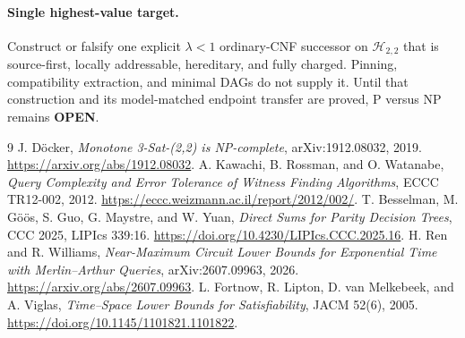 \documentclass[11pt]{article}
\begin{document}
\paragraph{Single highest-value target.}
Construct or falsify one explicit $\lambda<1$ ordinary-CNF successor on
$\mathcal H_{2,2}$ that is source-first, locally addressable, hereditary, and
fully charged.  Pinning, compatibility extraction, and minimal DAGs do not
supply it.  Until that construction and its model-matched endpoint transfer
are proved, P versus NP remains \textbf{OPEN}.

\begin{thebibliography}{9}
 J. D\"ocker, \emph{Monotone 3-Sat-(2,2) is NP-complete},
arXiv:1912.08032, 2019. \url{https://arxiv.org/abs/1912.08032}.
 A. Kawachi, B. Rossman, and O. Watanabe,
\emph{Query Complexity and Error Tolerance of Witness Finding Algorithms},
ECCC TR12-002, 2012. \url{https://eccc.weizmann.ac.il/report/2012/002/}.
 T. Besselman, M. G\"o\"os, S. Guo, G. Maystre, and W. Yuan,
\emph{Direct Sums for Parity Decision Trees}, CCC 2025, LIPIcs 339:16.
\url{https://doi.org/10.4230/LIPIcs.CCC.2025.16}.
 H. Ren and R. Williams,
\emph{Near-Maximum Circuit Lower Bounds for Exponential Time with
Merlin--Arthur Queries}, arXiv:2607.09963, 2026.
\url{https://arxiv.org/abs/2607.09963}.
 L. Fortnow, R. Lipton, D. van Melkebeek, and A. Viglas,
\emph{Time--Space Lower Bounds for Satisfiability}, JACM 52(6), 2005.
\url{https://doi.org/10.1145/1101821.1101822}.
\end{thebibliography}

\end{document}
